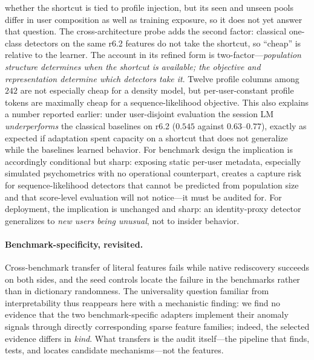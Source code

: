 \documentclass[10pt]{article} %
\newcommand{\rsix}{r6.2}
\begin{document}
whether the shortcut is tied to profile injection, but its seen and unseen pools
differ in user composition as well as training exposure, so it does not yet
answer that question. The cross-architecture
probe adds the second
factor: classical one-class detectors on the same \rsix{} features do not
take the shortcut, so ``cheap'' is relative to the learner. The account in
its refined form is two-factor---\emph{population structure determines
when the shortcut is available; the objective and representation determine
which detectors take it}. Twelve profile columns among $242$ are not
especially cheap for a density model, but per-user-constant profile tokens
are maximally cheap for a sequence-likelihood objective. This also
explains a number reported earlier: under user-disjoint evaluation the
session LM \emph{underperforms} the classical baselines on \rsix{}
($0.545$ against $0.63$--$0.77$), exactly as expected if adaptation spent
capacity on a shortcut that does not generalize while the baselines
learned behavior. For benchmark design the
implication is accordingly conditional but sharp: exposing static per-user
metadata, especially simulated psychometrics with no operational
counterpart, creates a capture risk for sequence-likelihood detectors that
cannot be predicted from population size and that score-level evaluation
will not notice---it must be audited for. For
deployment, the implication is unchanged and sharp: an identity-proxy
detector generalizes to \emph{new users being unusual}, not to insider
behavior.

\paragraph{Benchmark-specificity, revisited.}
Cross-benchmark transfer of literal features fails while native rediscovery
succeeds on both sides, and the seed controls locate the failure in the
benchmarks rather than in dictionary randomness. The universality question
familiar from interpretability \citep{olah2020zoom,chughtai2023toy} thus
reappears here with a mechanistic finding: we find no evidence that the two
benchmark-specific adapters implement their anomaly signals through directly
corresponding sparse feature families; indeed, the selected evidence differs
in \emph{kind}. What transfers is the audit itself---the pipeline that
finds, tests, and locates candidate mechanisms---not the features.
\end{document}
